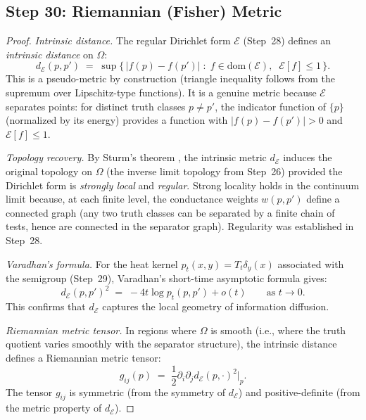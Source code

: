 
\subsection{Step 30: Riemannian (Fisher) Metric}\label{app:step30}

\begin{proof}
\emph{Intrinsic distance.}  The regular Dirichlet form $\mathcal{E}$
(Step~28) defines an \emph{intrinsic distance} on $\Omega$:
\[
  d_{\mathcal{E}}(p, p') \;=\;
  \sup\bigl\{\, |f(p) - f(p')| \;:\;
    f \in \mathrm{dom}(\mathcal{E}),\;\;
    \mathcal{E}[f] \leq 1 \,\bigr\}.
\]
This is a pseudo-metric by construction (triangle inequality follows from
the supremum over Lipschitz-type functions).  It is a genuine metric
because $\mathcal{E}$ separates points: for distinct truth classes
$p \neq p'$, the indicator function of $\{p\}$ (normalized by its
energy) provides a function with $|f(p) - f(p')| > 0$ and
$\mathcal{E}[f] \leq 1$.

\emph{Topology recovery.}  By Sturm's theorem \citep{sturm1994}, the
intrinsic metric $d_{\mathcal{E}}$ induces the original topology on
$\Omega$ (the inverse limit topology from Step~26) provided the
Dirichlet form is \emph{strongly local} and \emph{regular}.  Strong
locality holds in the continuum limit because, at each finite level, the
conductance weights $w(p, p')$ define a connected graph (any two truth
classes can be separated by a finite chain of tests, hence are connected
in the separator graph).  Regularity was established in Step~28.

\emph{Varadhan's formula.}  For the heat kernel
$p_t(x, y) = T_t \delta_y(x)$ associated with the semigroup (Step~29),
Varadhan's short-time asymptotic formula \citep{varadhan1967} gives:
\[
  d_{\mathcal{E}}(p, p')^2 \;=\;
  -4t \log p_t(p, p') + o(t) \qquad \text{as } t \to 0.
\]
This confirms that $d_{\mathcal{E}}$ captures the local geometry of
information diffusion.

\emph{Riemannian metric tensor.}  In regions where $\Omega$ is smooth
(i.e., where the truth quotient varies smoothly with the separator
structure), the intrinsic distance defines a Riemannian metric tensor:
\[
  g_{ij}(p) \;=\; \frac{1}{2} \partial_i \partial_j
    d_{\mathcal{E}}(p, \cdot)^2 \Big|_{p}.
\]
The tensor $g_{ij}$ is symmetric (from the symmetry of $d_{\mathcal{E}}$)
and positive-definite (from the metric property of $d_{\mathcal{E}}$).


\end{proof}
